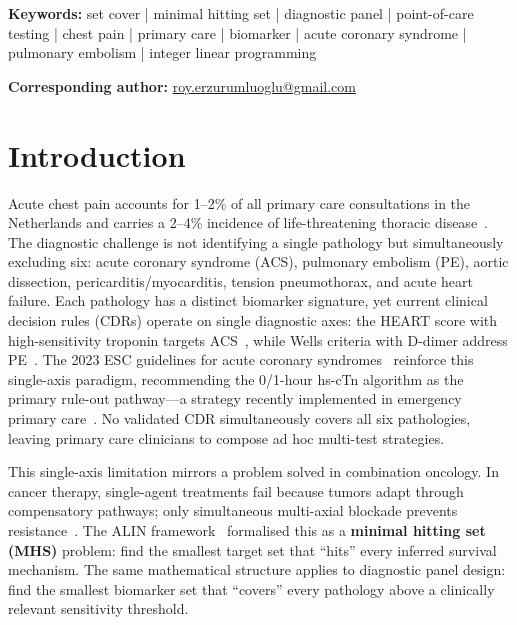 \documentclass[times, twoside, watermark]{zHenriquesLab-StyleBioRxiv}
\newenvironment{keywords}{\noindent\textbf{Keywords:} }{\par}%
\begin{document}
\begin{keywords}
set cover | minimal hitting set | diagnostic panel | point-of-care testing | chest pain | primary care | biomarker | acute coronary syndrome | pulmonary embolism | integer linear programming
\end{keywords}

\noindent\textbf{Corresponding author:} \href{mailto:roy.erzurumluoglu@gmail.com}{roy.erzurumluoglu@gmail.com}

\newpage
\twocolumn
\raggedbottom
\sloppy

\renewcommand{\dbltopfraction}{0.9}
\renewcommand{\textfraction}{0.07}
\renewcommand{\dblfloatpagefraction}{0.7}
\setcounter{dbltopnumber}{2}
\setcounter{topnumber}{3}
\setcounter{totalnumber}{5}


\section*{Introduction}

Acute chest pain accounts for 1--2\% of all primary care consultations in the Netherlands and carries a 2--4\% incidence of life-threatening thoracic disease~\cite{Schols2018}. The diagnostic challenge is not identifying a single pathology but simultaneously excluding six: acute coronary syndrome (ACS), pulmonary embolism (PE), aortic dissection, pericarditis/myocarditis, tension pneumothorax, and acute heart failure. Each pathology has a distinct biomarker signature, yet current clinical decision rules (CDRs) operate on single diagnostic axes: the HEART score with high-sensitivity troponin targets ACS~\cite{Six2008,Willemsen2021}, while Wells criteria with D-dimer address PE~\cite{Wells2000}. The 2023 ESC guidelines for acute coronary syndromes~\cite{Byrne2023} reinforce this single-axis paradigm, recommending the 0/1-hour hs-cTn algorithm as the primary rule-out pathway---a strategy recently implemented in emergency primary care~\cite{Johannessen2025}. No validated CDR simultaneously covers all six pathologies, leaving primary care clinicians to compose ad hoc multi-test strategies.

This single-axis limitation mirrors a problem solved in combination oncology. In cancer therapy, single-agent treatments fail because tumors adapt through compensatory pathways; only simultaneous multi-axial blockade prevents resistance~\cite{Liaki2025,Bergholz2021}. The ALIN framework~\cite{Erzurumluoglu2026ALIN} formalised this as a \textbf{minimal hitting set (MHS)} problem: find the smallest target set that ``hits'' every inferred survival mechanism. The same mathematical structure applies to diagnostic panel design: find the smallest biomarker set that ``covers'' every pathology above a clinically relevant sensitivity threshold.
\end{document}
